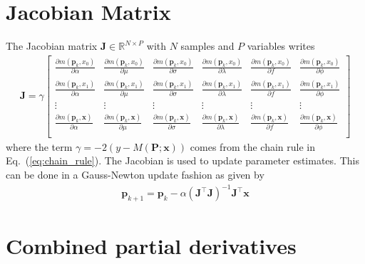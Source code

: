 \documentclass{article}
\begin{document}
\section{Jacobian Matrix}
The Jacobian matrix $\mathbf{J}\in\mathbb{R}^{N \times P}$ with $N$ samples and $P$ variables writes
\begin{align}
\mathbf{J} = \gamma
\begin{bmatrix}
\frac{\partial m\left(\mathbf{p}_k,x_0\right)}{\partial \alpha} &
\frac{\partial m\left(\mathbf{p}_k,x_0\right)}{\partial \mu} &
\frac{\partial m\left(\mathbf{p}_k,x_0\right)}{\partial \sigma} &
\frac{\partial m\left(\mathbf{p}_k,x_0\right)}{\partial \lambda} &
\frac{\partial m\left(\mathbf{p}_k,x_0\right)}{\partial f} &
\frac{\partial m\left(\mathbf{p}_k,x_0\right)}{\partial \phi} \\
\frac{\partial m\left(\mathbf{p}_k,x_1\right)}{\partial \alpha} &
\frac{\partial m\left(\mathbf{p}_k,x_1\right)}{\partial \mu} &
\frac{\partial m\left(\mathbf{p}_k,x_1\right)}{\partial \sigma} &
\frac{\partial m\left(\mathbf{p}_k,x_1\right)}{\partial \lambda} &
\frac{\partial m\left(\mathbf{p}_k,x_1\right)}{\partial f} &
\frac{\partial m\left(\mathbf{p}_k,x_1\right)}{\partial \phi} \\
\vdots & \vdots & \vdots & \vdots & \vdots & \vdots \\
\frac{\partial m\left(\mathbf{p}_k,\mathbf{x}\right)}{\partial \alpha} &
\frac{\partial m\left(\mathbf{p}_k,\mathbf{x}\right)}{\partial \mu} &
\frac{\partial m\left(\mathbf{p}_k,\mathbf{x}\right)}{\partial \sigma} &
\frac{\partial m\left(\mathbf{p}_k,\mathbf{x}\right)}{\partial \lambda} &
\frac{\partial m\left(\mathbf{p}_k,\mathbf{x}\right)}{\partial f} &
\frac{\partial m\left(\mathbf{p}_k,\mathbf{x}\right)}{\partial \phi} \\
\end{bmatrix}
\end{align}
where the term $\gamma=-2\left(y-M\left(\mathbf{P};\mathbf{x}\right)\right)$ comes from the chain rule in Eq.~(\ref{eq:chain_rule}). The Jacobian is used to update parameter estimates. This can be done in a Gauss-Newton update fashion as given by
\begin{align}
\mathbf{p}_{k+1} = \mathbf{p}_k - \alpha \left(\mathbf{J}^\intercal\mathbf{J}\right)^{-1}\mathbf{J}^\intercal\mathbf{x}
\end{align}

\section{Combined partial derivatives}
\end{document}
